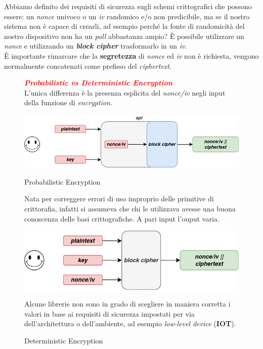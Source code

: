 \begin{flushleft}
    Abbiamo definito dei requisiti di sicurezza sugli schemi crittografici che possono essere: un \textit{nonce} univoco o un \textit{iv} randomico e/o non predicibile, ma se il nostro sistema non è capace di crearli, ad esempio perché la fonte di randomicità del nostro dispositivo non ha un \textit{poll} abbastanza ampio? È possibile utilizzare un \textit{nonce} e utilizzando un \textbf{\textit{block cipher}} trasformarlo in un \textit{iv}. \\
    È importante rimarcare che la \textbf{segretezza} di \textit{nonce} ed \textit{iv} non è richiesta, vengono normalmente concatenati come prefisso del \textit{ciphertext}.
\end{flushleft}

\begin{figure}[h]
    \centering
    \textcolor{red}{\textbf{\textit{Probabilistic vs Deterministic Encryption}}} \\
    L'unica differenza è la presenza esplicita del \textit{nonce/iv} negli input della funzione di \textit{encryption}.
    \begin{minipage}[c]{0.4\textwidth}
        \centering
        \includegraphics[width=\textwidth]{img/prob_enc.png}
        \caption{Probabilistic Encryption}
        Nata per correggere errori di uso improprio delle primitive di crittorafia, infatti si assumeva che chi le utilizzava avesse una buona conoscenza delle basi crittografiche. A pari input l'ouput varia.
    \end{minipage}
    \hfill
    \begin{minipage}[c]{0.4\textwidth}
        \centering
        \includegraphics[width=\textwidth]{img/det_enc.png}
        \caption{Deterministic Encryption}
        Alcune librerie non sono in grado di scegliere in maniera corretta i valori in base ai requisiti di sicurezza impostati per via dell'architettura o dell'ambiente, ad esempio \textit{low-level device} (\textbf{IOT}).
    \end{minipage}
\end{figure}

